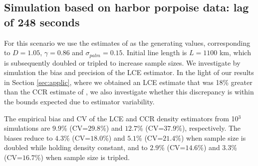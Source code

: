 \documentclass[useAMS, usenatbib, referee]{biom}\usepackage[]{graphicx}\usepackage[]{color}
\begin{document}

\subsection{Simulation based on harbor porpoise data: lag of 248 seconds}


For this scenario we use the estimates of \cite{Stevenson+al:19} as the generating values, corresponding to $D=1.05$, $\gamma=0.86$ and $\sigma_{palm}=0.15$. Initial line length is $L=1100$ km, which is subsequently doubled or tripled to increase sample sizes. We investigate by simulation the bias and precision of the LCE estimator. In the light of our results in Section \ref{sec:applic}, where we obtained an LCE estimate that was 18\% greater than the CCR estimate of \cite{Stevenson+al:19}, we also investigate whether this discrepancy is within the bounds expected due to estimator variability.





The empirical bias and CV of the LCE and CCR density estimators from 10$^3$ simulations are $9.9$\% (CV=$29.8$\%) and $12.7$\% (CV=$37.9$\%), respectively. The biases reduce to $4.3$\% (CV=$18.0$\%) and $5.1$\% (CV=$21.4$\%) when sample size is doubled while holding density constant, and to $2.9$\% (CV=$14.6$\%) and $3.3$\% (CV=$16.7$\%) when sample size is tripled.

\end{document}

